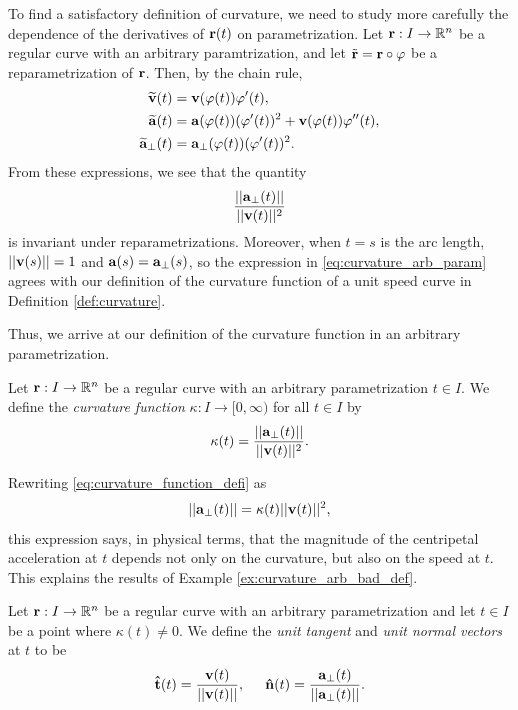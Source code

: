 \documentclass[12pt,letterpaper,reqno]{article}
\numberwithin{equation}{section}
\newcommand{\R}{\ensuremath{\mathbb R}}
\newcommand{\bv}{{\bf v}}
\newcommand{\ba}{{\bf a}}
\newcommand{\bbr}{{\bf r}}
\newcommand{\ut}{{\bf {\hat{t}}}}
\newcommand{\un}{{\bf {\hat{n}}}}
\begin{document}
{To find a satisfactory definition of curvature, we need to study more carefully the dependence of the derivatives of $\bbr(t)$ on parametrization. Let $\bbr:I \to \R^n$ be a regular curve with an arbitrary paramtrization, and let $\tilde{\bbr}=\bbr \circ \varphi$ be a reparametrization of $\bbr$. Then, by the chain rule,
\begin{align*}
	\widetilde{\bv}(t)&=\bv(\varphi(t))\varphi'(t), \\
	\widetilde{\ba}(t)&=\ba(\varphi(t))(\varphi'(t))^2+\bv(\varphi(t))\varphi''(t), \\
\widetilde{\ba}_\perp(t)&=\ba_\perp(\varphi(t))(\varphi'(t))^2.
\end{align*}
From these expressions, we see that the quantity
\begin{align}\label{eq:curvature_arb_param}
	\frac{||\ba_\perp(t)||}{||\bv(t)||^2}
\end{align}
is invariant under reparametrizations. Moreover, when $t=s$ is the arc length, $||\bv(s)||=1$ and $\ba(s)=\ba_\perp(s)$, so the expression in \eqref{eq:curvature_arb_param} agrees with our definition of the curvature function of a unit speed curve in Definition \ref{def:curvature}.

Thus, we arrive at our definition of the curvature function in an arbitrary parametrization.
\begin{defn}
	Let $\bbr:I \to \R^n$ be a regular curve with an arbitrary parametrization $t \in I$. We define the \emph{curvature function} $\kappa:I \to [0,\infty)$ for all $t \in I$ by
	\begin{align}\label{eq:curvature_function_defi}
		\kappa(t)=\frac{||\ba_\perp(t)||}{||\bv(t)||^2}.
	\end{align}
\end{defn}
Rewriting \eqref{eq:curvature_function_defi} as 
\begin{align*}
	||\ba_\perp(t)||=\kappa(t)||\bv(t)||^2,
\end{align*}
this expression says, in physical terms, that the magnitude of the centripetal acceleration at $t$ depends not only on the curvature, but also on the speed at $t$. This explains the results of Example \ref{ex:curvature_arb_bad_def}.

\begin{defn}
	Let $\bbr:I \to \R^n$ be a regular curve with an arbitrary parametrization and let $t \in I$ be a point where $\kappa(t) \neq 0$. We define the \emph{unit tangent} and \emph{unit normal vectors} at $t$ to be 
	\begin{align*}
		\ut(t)=\frac{\bv(t)}{||\bv(t)||}, \hspace{0.5cm} \un(t)=\frac{\ba_\perp(t)}{||\ba_\perp(t)||}.
	\end{align*} 
\end{defn}

}
\end{document}
